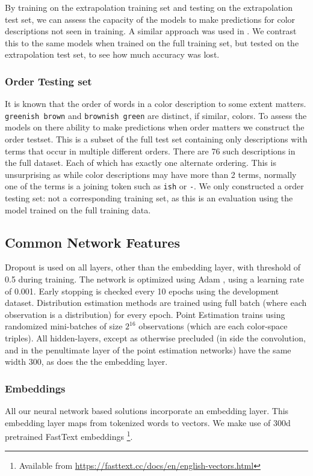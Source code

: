 \documentclass[11pt,a4paper]{article}
\newcommand{\parencite}{\citep}
\newcommand{\textcite}{\citet}
\newcommand{\natlang}[1]{\texttt{#1}}
\begin{document}
By training on the extrapolation training set and testing on the extrapolation test set, we can assess the capacity of the models to make predictions for color descriptions not seen in training.
A similar approach was used in \textcite{DBLP:journals/corr/AtzmonBKGC16}.
We contrast this to the same models when trained on the full training set, but tested on the extrapolation test set, to see how much accuracy was lost.


\subsubsection{Order Testing set}
It is known that the order of words in a color description to some extent matters.
\natlang{greenish brown} and \natlang{brownish green} are distinct, if similar, colors.
To assess the models on there ability to make predictions when order matters we construct the order testset.
This is a subset of the full test set containing only descriptions with terms that occur in multiple different orders.
There are 76 such descriptions in the full dataset.
Each of which has exactly one alternate ordering.
This is unsurprising as while color descriptions may have more than 2 terms, normally one of the terms is a joining token such as \natlang{ish} or \natlang{-}.
We only constructed a order testing set: not a corresponding training set, as this is an evaluation using the model trained on the full training data.



\subsection{Common Network Features}
Dropout\parencite{srivastava2014dropout}  is used on all layers, other than the embedding layer, with threshold of 0.5 during training.
The network is optimized using Adam
\cite{kingma2014adam}, using a learning rate of 0.001.
Early stopping is checked every 10 epochs using the development dataset.
Distribution estimation methods are trained using full batch (where each observation is a distribution) for every epoch.
Point Estimation trains using randomized mini-batches of size $2^16$ observations (which are each color-space triples).
All hidden-layers, except as otherwise precluded (in side the convolution, and in the penultimate layer of the point estimation networks) have the same width 300, as does the the embedding layer.


\subsubsection{Embeddings}\label{sec:embeddings} 
All our neural network based solutions incorporate an embedding layer.
This embedding layer maps from tokenized words to vectors.
We make use of 300d pretrained FastText embeddings \textcite{bojanowski2016enriching}\footnote{Available from \url{https://fasttext.cc/docs/en/english-vectors.html}}.
\end{document}

